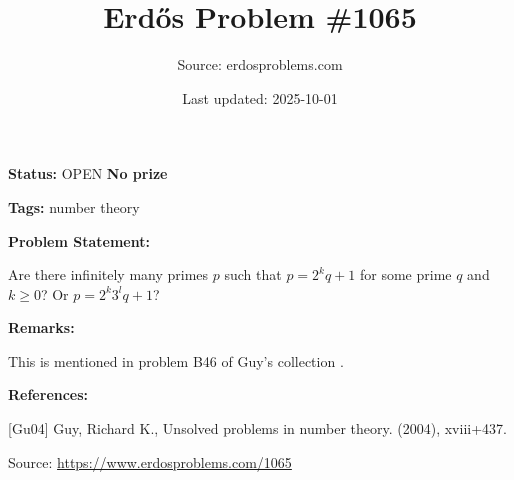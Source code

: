 \documentclass{article}
\title{Erd\H{o}s Problem \#1065}
\date{Last updated: 2025-10-01}
\author{Source: erdosproblems.com}
\begin{document}
\maketitle

\noindent\textbf{Status:} OPEN \quad \textbf{No prize}

\noindent\textbf{Tags:} number theory

\medskip
\noindent\textbf{Problem Statement:}

Are there infinitely many primes $p$ such that $p=2^kq+1$ for some prime $q$ and $k\geq 0$? Or $p=2^k3^lq+1$?

\bigskip
\noindent\textbf{Remarks:}

This is mentioned in problem B46 of Guy's collection \cite{Gu04}.

\bigskip
\noindent\textbf{References:}

[Gu04] Guy, Richard K., Unsolved problems in number theory. (2004), xviii+437.

\bigskip
\noindent\small{Source: \url{https://www.erdosproblems.com/1065}}
\end{document}
